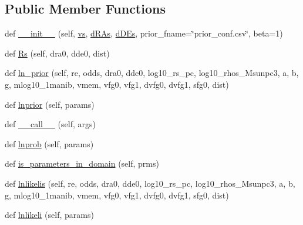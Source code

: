 \subsection*{Public Member Functions}
\begin{DoxyCompactItemize}
\item 
def \hyperlink{classmodKI17__without__astropy_1_1modKI17_a89acb6a530ce5cc12d1635b19e744494}{\+\_\+\+\_\+init\+\_\+\+\_\+} (self, \hyperlink{classmodKI17__without__astropy_1_1modKI17_a8a56150fe457d8eb85ff2f79d3b484cc}{vs}, \hyperlink{classmodKI17__without__astropy_1_1modKI17_a9c59e743c78ddd91d8b1ae847cea17eb}{d\+R\+As}, \hyperlink{classmodKI17__without__astropy_1_1modKI17_adf06e4bd1ebee33ba8328dfe29ff0903}{d\+D\+Es}, prior\+\_\+fname=\char`\"{}prior\+\_\+conf.\+csv\char`\"{}, beta=1)
\item 
def \hyperlink{classmodKI17__without__astropy_1_1modKI17_a244312ee38d1fb267b6df28b53096c14}{Rs} (self, dra0, dde0, dist)
\item 
def \hyperlink{classmodKI17__without__astropy_1_1modKI17_a4ebd2891cdc0426fcb517062f49c19d6}{ln\+\_\+prior} (self, re, odds, dra0, dde0, log10\+\_\+rs\+\_\+pc, log10\+\_\+rhos\+\_\+\+Msunpc3, a, b, g, mlog10\+\_\+1manib, vmem, vfg0, vfg1, dvfg0, dvfg1, sfg0, dist)
\item 
def \hyperlink{classmodKI17__without__astropy_1_1modKI17_abd872f61c836ff783aa00f80a94674b2}{lnprior} (self, params)
\item 
def \hyperlink{classmodKI17__without__astropy_1_1modKI17_aee859d09f6c45a00d6dfa09f40fcd474}{\+\_\+\+\_\+call\+\_\+\+\_\+} (self, args)
\item 
def \hyperlink{classmodKI17__without__astropy_1_1modKI17_abd696e0c2e8175f37ed01a6d60799458}{lnprob} (self, params)
\item 
def \hyperlink{classmodKI17__without__astropy_1_1modKI17_a3902e77a9423d8d874400b1bc6291ef7}{is\+\_\+parameters\+\_\+in\+\_\+domain} (self, prms)
\item 
def \hyperlink{classmodKI17__without__astropy_1_1modKI17_ab936b4548a8cece5971ccd63db9bccc5}{lnlikelis} (self, re, odds, dra0, dde0, log10\+\_\+rs\+\_\+pc, log10\+\_\+rhos\+\_\+\+Msunpc3, a, b, g, mlog10\+\_\+1manib, vmem, vfg0, vfg1, dvfg0, dvfg1, sfg0, dist)
\item 
def \hyperlink{classmodKI17__without__astropy_1_1modKI17_aa78ac0827335ae5b100709d37d06e946}{lnlikeli} (self, params)
\end{DoxyCompactItemize}
